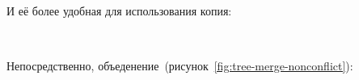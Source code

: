 \begin{code}%
\>\AgdaFunction{\_\textasciicircum\_} \AgdaSymbol{:} \AgdaSymbol{(}  \AgdaSymbol{:} \AgdaSymbol{)}      \<%
\\
\>\AgdaFunction{\_\textasciicircum\_}   \AgdaSymbol{(} \AgdaSymbol{)} \AgdaSymbol{=} \<%
\\
\>\AgdaFunction{\_\textasciicircum\_}   \AgdaSymbol{(} \AgdaSymbol{)} \AgdaSymbol{=} \<%
\\
\>\AgdaFunction{\_\textasciicircum\_} \AgdaSymbol{(}  \AgdaSymbol{)} \AgdaSymbol{(}  \AgdaSymbol{)} \AgdaSymbol{(}  \AgdaSymbol{)} \AgdaSymbol{=} \<[53]%
\>[53]\<%
\\
\>[0]\<[2]%
\>[2] \AgdaSymbol{((} \AgdaFunction{\textasciicircum} \AgdaSymbol{)} \AgdaSymbol{)} \AgdaSymbol{((} \AgdaFunction{\textasciicircum} \AgdaSymbol{)} \AgdaSymbol{)}\<%
\end{code}

И её более удобная для использования копия:

\begin{code}%
\> \AgdaSymbol{:} \AgdaSymbol{\{}  \AgdaSymbol{:} \AgdaSymbol{\}}      \<%
\\
\> \AgdaSymbol{\{}\AgdaSymbol{\}} \AgdaSymbol{\{}\AgdaSymbol{\}}  \AgdaSymbol{=} \AgdaSymbol{(} \AgdaFunction{\textasciicircum} \AgdaSymbol{)} \<%
\end{code}

Непосредственно, объеденение~(рисунок~\ref{fig:tree-merge-nonconflict}):

